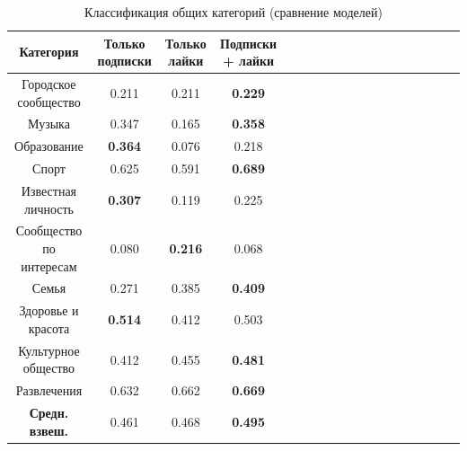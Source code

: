 \documentclass[times,specification,annotation]{itmo-student-thesis}
\begin{document}
\begin{table}[!h]
\caption{Классификация общих категорий (сравнение моделей)}\label{tab-all-g}
\centering
\begin{tabular}{|*{18}{c|}}\hline
Категория & Только подписки  & Только лайки & Подписки + лайки \\\hline
Городское сообщество         & 0.211 & 0.211 &\textbf{0.229}  \\\hline
Музыка         & 0.347 & 0.165 & \textbf{0.358}  \\\hline
Образование         & \textbf{0.364} & 0.076 & 0.218 \\\hline
Спорт         & 0.625 & 0.591 & \textbf{0.689}    \\\hline
Известная личность         & \textbf{0.307} & 0.119 & 0.225 \\\hline
Сообщество по интересам         & 0.080 & \textbf{0.216} & 0.068 \\\hline
Семья         & 0.271 & 0.385 & \textbf{0.409} \\\hline
Здоровье и красота          & \textbf{0.514} & 0.412 & 0.503 \\\hline
Культурное общество         & 0.412 & 0.455 & \textbf{0.481} \\\hline
Развлечения           & 0.632 & 0.662 & \textbf{0.669} \\\hline
\textbf{Средн. взвеш.}  & 0.461 & 0.468 & \textbf{0.495}  \\\hline
\end{tabular}
\end{table}
\end{document}
